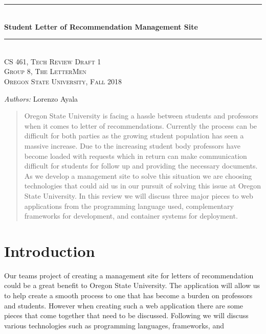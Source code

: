 \documentclass[letterpaper, 10pt, draftclsnofoot,onecolumn]{IEEEtran}
\begin{document}
\begin{titlepage}
    \newcommand{\HRule}{\rule{\linewidth}{0.5mm}}
    \center 
    \HRule \\[0.4cm]
    { \Large \bfseries Student Letter of Recommendation Management Site}\\[0.4cm] 
    \HRule \\[0.5cm]
    \center 
    \textsc{\Large CS 461, Tech Review Draft 1}\\[0.5cm] 
    \textsc{\Large Group 8, The LetterMen}\\[0.5cm] 
    \textsc{\Large Oregon State University, Fall 2018}\\[0.5cm] 
    \begin{minipage}{0.4\textwidth}
        \begin{center} \large
        \emph{Authors:} Lorenzo Ayala
        \end{center}
    \end{minipage}
    \vspace{2cm}
    \begin{abstract}
    Oregon State University is facing a hassle between students and professors when it comes to letter of recommendations. Currently the process can be difficult for both parties as the growing student population has seen a massive increase. Due to the increasing student body professors have become loaded with requests which in return can make communication difficult for students for follow up and providing the necessary documents. As we develop a management site to solve this situation we are choosing technologies that could aid us in our pursuit of solving this issue at Oregon State University. In this review we will discuss three major pieces to web applications from the programming language used, complementary frameworks for development, and container systems for deployment. 
    \end{abstract}
    \vfill %
\end{titlepage}
\newpage
{}
\clearpage

\section{Introduction}
Our teams project of creating a management site for letters of recommendation could be a great benefit to Oregon State University. The application will allow us to help create a smooth process to one that has become a burden on professors and students. However when creating such a web application there are some pieces that come together that need to be discussed. Following we will discuss various technologies such as programming languages, frameworks, and 
\end{document}
